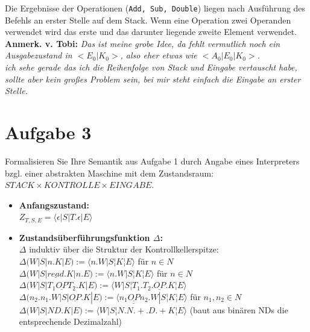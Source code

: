 \documentclass[ngerman,a4paper]{report}
\begin{document}
Die Ergebnisse der Operationen (\lstinline!Add, Sub, Double!) liegen nach Ausführung des Befehls an erster Stelle auf dem Stack. Wenn eine Operation zwei Operanden verwendet wird das erste und das darunter liegende zweite Element verwendet.\\
\textbf{Anmerk. v. Tobi:} \emph{Das ist meine grobe Idee, da fehlt vermutlich noch ein Ausgabezustand in $<E_0|K_0>$, also eher etwas wie $<A_0|E_0|K_0>$.\\ ich sehe gerade das ich die Reihenfolge von Stack und Eingabe vertauscht habe, sollte aber kein großes Problem sein, bei mir steht einfach die Eingabe an erster Stelle.}\\
\section*{Aufgabe 3}
Formalisieren Sie Ihre Semantik aus Aufgabe 1 durch Angabe eines Interpreters bzgl. einer abstrakten Maschine mit dem Zustandsraum: $STACK \times KONTROLLE \times EINGABE$.\\

\begin{itemize}
	\item \textbf{Anfangszustand:}\\
		$Z_{T,S,E} = \langle\epsilon|S|T.\epsilon|E\rangle$\\
	\item \textbf{Zustandsüberführungsfunktion $\Delta$:}\\
		$\Delta$ induktiv über die Struktur der Kontrollkellerspitze:\\
		$\Delta (W|S|n.K|E) := \langle n.W|S¦K¦E\rangle$ für $n \in N$\\
		$\Delta (W|S|\underline{read}.K|n.E) := \langle n.W|S¦K¦E\rangle$ für $n \in N$\\
		$\Delta (W|S|T_1 \underline{OP} T_2.K|E) := \langle W|S¦T_1.T_2.\underline{OP}.K¦E\rangle$\\
		$\Delta (n_2.n_1.W|S|\underline{OP}.K|E) := \langle \underline{n_1\underline{OP}n_2}.W|S¦K¦E\rangle$ für $n_1,n_2 \in N$\\

		$\Delta (W|S|ND.K|E) := \langle W|S¦N.N.+.D.+K¦E\rangle$ (baut aus binären NDs die entsprechende Dezimalzahl)\\

\end{itemize}
\end{document}
